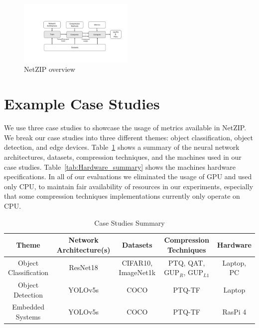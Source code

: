 \begin{figure}[h]
    \centering
    \includegraphics[width=0.49\textwidth]{other/figures/NetZIP_overview.pdf}
    \caption{NetZIP overview}
    \label{fig:Netzip}
\end{figure}



\section{Example Case Studies} \label{sec:casestudies}
We use three case studies to showcase the usage of metrics available in NetZIP. We break our case studies into three different themes: object classification, object detection, and edge devices. 
%
Table~\ref{tab:casestudy_summary} shows a summary of the neural network architectures, datasets, compression techniques, and the machines used in our case studies. Table~\ref{tab:Hardware_summary} shows the machines hardware specifications. In all of our evaluations we eliminated the usage of GPU and used only CPU, to maintain fair availability of resources in our experiments, especially that some compression techniques implementations currently only operate on CPU. 

\begin{table}[]
    \centering
    \begin{tabular}{| c  | c | c | c | c |} 
        \hline
        Theme & Network Architecture(s) & Datasets & Compression Techniques & Hardware  \\
        \hline        
        Object Classification  & ResNet18 & CIFAR10, ImageNet1k & PTQ, QAT, GUP$_R$, GUP$_{L1}$ & Laptop, PC \\ 
        Object Detection  & YOLOv5s & COCO  &  PTQ-TF  & Laptop  \\
        Embedded Systems  & YOLOv5s & COCO  & PTQ-TF  & RasPi 4 \\
        \hline
    \end{tabular}
    \caption{Case Studies Summary}
    \label{tab:casestudy_summary}
\end{table}



